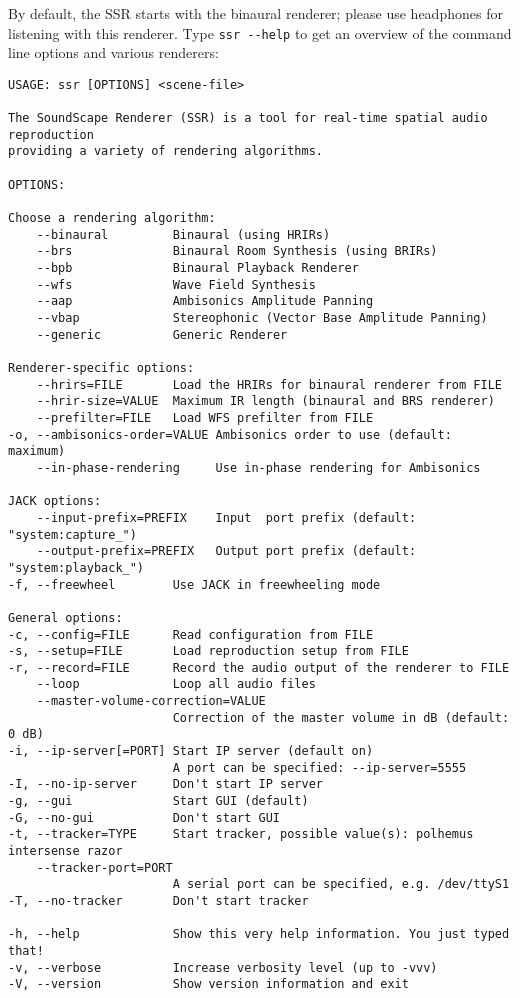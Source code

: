 By default, the SSR starts with the binaural renderer; please use
headphones for listening with this renderer.
Type \verb+ssr --help+ to get an overview of the command
line options and various renderers:

{\small
\begin{verbatim}
USAGE: ssr [OPTIONS] <scene-file>

The SoundScape Renderer (SSR) is a tool for real-time spatial audio reproduction
providing a variety of rendering algorithms.

OPTIONS:

Choose a rendering algorithm:
    --binaural         Binaural (using HRIRs)
    --brs              Binaural Room Synthesis (using BRIRs)
    --bpb              Binaural Playback Renderer
    --wfs              Wave Field Synthesis
    --aap              Ambisonics Amplitude Panning
    --vbap             Stereophonic (Vector Base Amplitude Panning)
    --generic          Generic Renderer

Renderer-specific options:
    --hrirs=FILE       Load the HRIRs for binaural renderer from FILE
    --hrir-size=VALUE  Maximum IR length (binaural and BRS renderer)
    --prefilter=FILE   Load WFS prefilter from FILE
-o, --ambisonics-order=VALUE Ambisonics order to use (default: maximum)
    --in-phase-rendering     Use in-phase rendering for Ambisonics

JACK options:
    --input-prefix=PREFIX    Input  port prefix (default: "system:capture_")
    --output-prefix=PREFIX   Output port prefix (default: "system:playback_")
-f, --freewheel        Use JACK in freewheeling mode

General options:
-c, --config=FILE      Read configuration from FILE
-s, --setup=FILE       Load reproduction setup from FILE
-r, --record=FILE      Record the audio output of the renderer to FILE
    --loop             Loop all audio files
    --master-volume-correction=VALUE
                       Correction of the master volume in dB (default: 0 dB)
-i, --ip-server[=PORT] Start IP server (default on)
                       A port can be specified: --ip-server=5555
-I, --no-ip-server     Don't start IP server
-g, --gui              Start GUI (default)
-G, --no-gui           Don't start GUI
-t, --tracker=TYPE     Start tracker, possible value(s): polhemus intersense razor
    --tracker-port=PORT
                       A serial port can be specified, e.g. /dev/ttyS1
-T, --no-tracker       Don't start tracker

-h, --help             Show this very help information. You just typed that!
-v, --verbose          Increase verbosity level (up to -vvv)
-V, --version          Show version information and exit
\end{verbatim}
}

